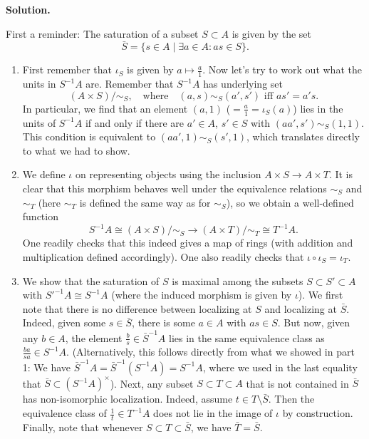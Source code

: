 \documentclass[a4paper,11pt]{article}
\begin{document}
\textbf{Solution.}

First a reminder: The saturation of a subset $S \subset A$ is given by the set
$$\bar S = \{s \in A \mid \exists a \in A : as \in S\}.$$

\begin{enumerate}
    \item First remember that $\iota_S$ is given by $a \mapsto \frac a1$. 
        Now let's try to work out what the units in $S^{-1}A$ are. Remember that
        $S^{-1}A$ has underlying set 
        \begin{equation*}
            (A \times S) / \sim_S, \quad \text{where} \quad
            (a,s) \sim_S (a', s') \text{ iff } as' = a's. 
        \end{equation*}
        In particular, we find that an element $(a,1)$ ($=\frac a1 = \iota_S(a)$)
        lies in the units of
        $S^{-1}A$ if and only if there are $a' \in A$, $s' \in S$ with 
        $(a a', s') \sim_S (1,1)$. This condition is equivalent to
        $(a a', 1) \sim_S (s', 1)$, which translates directly to what we had to
        show. 

    \item We define $\iota$ on representing objects using the inclusion
        $A \times S \to A \times T$. It is clear that this morphism behaves well
        under the equivalence relations $\sim_S$ and $\sim_T$ (here $\sim_T$ is
        defined the same way as for $\sim_S$), so we obtain a well-defined function
        \begin{equation*}
            S^{-1}A \cong (A \times S)/\sim_S \to (A\times T)/\sim_T \cong T^{-1}A.
        \end{equation*}
        One readily checks that this indeed gives a map of rings (with
        addition and multiplication defined accordingly). One also readily checks 
        that $\iota \circ \iota_S = \iota_T$. 

    \item We show that the saturation of $S$ is maximal among the subsets $S
        \subset S' \subset A$ with $S'^{-1} A \cong S^{-1} A$ (where the induced 
        morphism is given by $\iota$). 
        We first note that there is no difference between localizing at $S$ and
        localizing at $\bar S$. Indeed, given some $s \in \bar S$, there is 
        some $a \in A$ with $as \in S$. But now, given any $b \in A$, the element 
        $\frac bs \in \bar S^{-1} A$ lies in the same equivalence class
        as $\frac{ba}{sa} \in S^{-1} A$. (Alternatively, this follows directly from 
        what we showed in part 1: We have $\bar S^{-1} A = \bar S^{-1}(S^{-1} A) = S^{-1}A$,
        where we used in the last equality that $\bar S \subset
        (S^{-1}A)^\times$). Next, any subset $S \subset T \subset A$
        that is not contained in $\bar S$ has non-isomorphic localization.
        Indeed, assume $t \in T \setminus \bar S$. Then the
        equivalence class of $\frac 1t \in T^{-1}A$ does not lie in the image
        of $\iota$ by construction. Finally, note that whenever
        $S \subset T \subset \bar S$, we have $\bar T = \bar S$. 
        

\end{enumerate}
\end{document}
